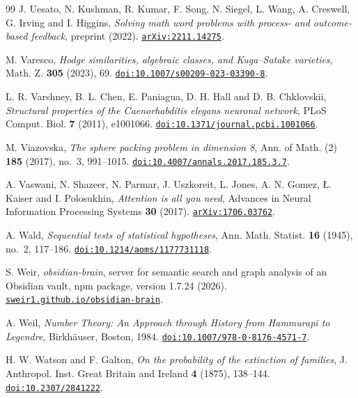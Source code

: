 \begin{thebibliography}{99}
J. Uesato, N. Kushman, R. Kumar, F. Song, N. Siegel, L. Wang, A. Creswell, G. Irving and I. Higgins,
\emph{Solving math word problems with process- and outcome-based feedback},
preprint (2022).
\href{https://arxiv.org/abs/2211.14275}{\nolinkurl{arXiv:2211.14275}}.

M. Varesco,
\emph{Hodge similarities, algebraic classes, and Kuga--Satake varieties},
Math. Z. \textbf{305} (2023), 69.
\href{https://doi.org/10.1007/s00209-023-03390-8}{\nolinkurl{doi:10.1007/s00209-023-03390-8}}.

L. R. Varshney, B. L. Chen, E. Paniagua, D. H. Hall and D. B. Chklovskii,
\emph{Structural properties of the Caenorhabditis elegans neuronal network},
PLoS Comput. Biol. \textbf{7} (2011), e1001066.
\href{https://doi.org/10.1371/journal.pcbi.1001066}{\nolinkurl{doi:10.1371/journal.pcbi.1001066}}.

M. Viazovska,
\emph{The sphere packing problem in dimension 8},
Ann. of Math. (2) \textbf{185} (2017), no.~3, 991--1015.
\href{https://doi.org/10.4007/annals.2017.185.3.7}{\nolinkurl{doi:10.4007/annals.2017.185.3.7}}.

A. Vaswani, N. Shazeer, N. Parmar, J. Uszkoreit, L. Jones, A. N. Gomez, \L{}. Kaiser and I. Polosukhin,
\emph{Attention is all you need},
Advances in Neural Information Processing Systems \textbf{30} (2017).
\href{https://arxiv.org/abs/1706.03762}{\nolinkurl{arXiv:1706.03762}}.

A. Wald,
\emph{Sequential tests of statistical hypotheses},
Ann. Math. Statist. \textbf{16} (1945), no.~2, 117--186.
\href{https://doi.org/10.1214/aoms/1177731118}{\nolinkurl{doi:10.1214/aoms/1177731118}}.

S. Weir,
\emph{obsidian-brain}, server for semantic search and graph analysis of an Obsidian vault, npm package, version 1.7.24 (2026).
\href{https://sweir1.github.io/obsidian-brain/}{\nolinkurl{sweir1.github.io/obsidian-brain}}.

A. Weil,
\emph{Number Theory: An Approach through History from Hammurapi to Legendre},
Birkh\"auser, Boston, 1984.
\href{https://doi.org/10.1007/978-0-8176-4571-7}{\nolinkurl{doi:10.1007/978-0-8176-4571-7}}.

H. W. Watson and F. Galton,
\emph{On the probability of the extinction of families},
J. Anthropol. Inst. Great Britain and Ireland \textbf{4} (1875), 138--144.
\href{https://doi.org/10.2307/2841222}{\nolinkurl{doi:10.2307/2841222}}.


\end{thebibliography}

